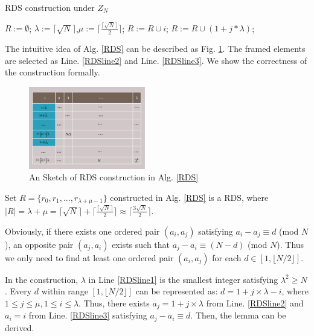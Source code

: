 \begin{algorithm}[!h]
\caption{RDS construction under $Z_N$}
\label{RDS}
\begin{algorithmic}[1]
\STATE $R :=\emptyset$;
\STATE $\lambda :=\lceil \sqrt{N}  \rceil$,$\mu :=\lceil \frac{\lceil \sqrt{N} \rceil}{2} \rceil$;\label{RDSline1}
	\STATE $R :=R \cup i$; \label{RDSline2}
\ENDFOR
{}
	\STATE $R :=R \cup (1 + j * \lambda )$; \label{RDSline3}
\ENDFOR
\end{algorithmic}
\end{algorithm}


The intuitive idea of Alg. \ref{RDS} can be described as Fig. \ref{matrix}.
The framed elements are selected as Line. \ref{RDSline2} and Line. \ref{RDSline3}.
We show the correctness of the construction formally.

\begin{figure}[!h]
\centering
\includegraphics[width=2in]{./Figure/matrix}
\caption{An Sketch of RDS construction in Alg. \ref{RDS}}
\label{matrix}
\end{figure}


\begin{lemma}
\label{RDS1}
Set $R = \{r_0, r_1, ..., r_{\lambda + \mu - 1}\}$ constructed in Alg. \ref{RDS} is a RDS,
where $|R| = \lambda + \mu = \lceil \sqrt{N}  \rceil + \lceil \frac{\lceil \sqrt{N} \rceil}{2} \rceil
\approx \lceil \frac{3\sqrt{N}}{2}  \rceil$.
\end{lemma}


\begin{IEEEproof}
Obviously, if there exists one ordered pair $(a_i,a_j)$ satisfying  $a_i - a_j \equiv d$ (mod $N$),
an opposite pair $(a_j,a_i)$ exists such that
$a_j - a_i \equiv (N-d)$ (mod $N$). Thus we only need to find
at least one ordered pair $(a_i,a_j)$ for each $d \in [1, \lfloor N/2 \rfloor]$.

In the construction, $\lambda$ in Line \ref{RDSline1} is the smallest integer satisfying
$\lambda^2 \geq N$. Every $d$ within range $[1, \lfloor N/2 \rfloor]$
can be represented as: $ d = 1 + j \times \lambda - i$, where $1 \leq j \leq \mu,
1 \leq i \leq \lambda$. Thus, there exists $a_j = 1 + j \times \lambda$
from Line. \ref{RDSline2} and $a_i = i$ from Line. \ref{RDSline3}
satisfying  $a_j - a_i \equiv d$. Then, the lemma can be derived.
\end{IEEEproof}


